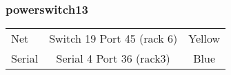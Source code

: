\subsubsection{powerswitch13}
\begin{table}[H]
\begin{tabular}{|l|c|c|}\hline
Net & Switch 19 Port 45 (rack 6) & Yellow \\
Serial & Serial 4 Port 36 (rack3) & Blue \\ \hline
\end{tabular}
\end{table}
